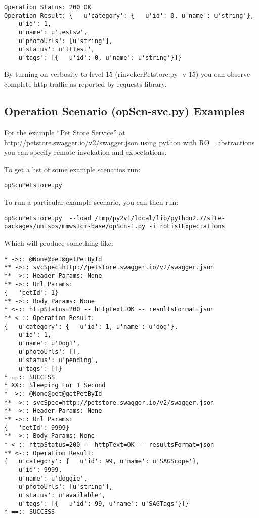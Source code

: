 \documentclass{article}
\begin{document}
\begin{verbatim}
Operation Status: 200 OK
Operation Result: {   u'category': {   u'id': 0, u'name': u'string'},
    u'id': 1,
    u'name': u'testsw',
    u'photoUrls': [u'string'],
    u'status': u'tttest',
    u'tags': [{   u'id': 0, u'name': u'string'}]}
\end{verbatim}

By turning on verbosity to level 15 (rinvokerPetstore.py -v 15) you can observe 
complete  http traffic as reported by requests library.

\subsection{Operation Scenario (opScn-svc.py) Examples}

For the example ``Pet Store Service'' at http://petstore.swagger.io/v2/swagger.json
using python with RO\_ abstractions you can specify remote invokation and expectations.

To get a list of some example scenatios run:

\begin{verbatim}
opScnPetstore.py
\end{verbatim}

To run a particular example scenario, you can then run:

\begin{verbatim}
opScnPetstore.py  --load /tmp/py2v1/local/lib/python2.7/site-packages/unisos/mmwsIcm-base/opScn-1.py -i roListExpectations
\end{verbatim}

Which will produce something like:

\begin{verbatim}
* ->:: @None@pet@getPetById
** ->:: svcSpec=http://petstore.swagger.io/v2/swagger.json
** ->:: Header Params: None
** ->:: Url Params: 
{   'petId': 1}
** ->:: Body Params: None
* <-:: httpStatus=200 -- httpText=OK -- resultsFormat=json
** <-:: Operation Result: 
{   u'category': {   u'id': 1, u'name': u'dog'},
    u'id': 1,
    u'name': u'Dog1',
    u'photoUrls': [],
    u'status': u'pending',
    u'tags': []}
* ==:: SUCCESS
* XX:: Sleeping For 1 Second
* ->:: @None@pet@getPetById
** ->:: svcSpec=http://petstore.swagger.io/v2/swagger.json
** ->:: Header Params: None
** ->:: Url Params: 
{   'petId': 9999}
** ->:: Body Params: None
* <-:: httpStatus=200 -- httpText=OK -- resultsFormat=json
** <-:: Operation Result: 
{   u'category': {   u'id': 99, u'name': u'SAGScope'},
    u'id': 9999,
    u'name': u'doggie',
    u'photoUrls': [u'string'],
    u'status': u'available',
    u'tags': [{   u'id': 99, u'name': u'SAGTags'}]}
* ==:: SUCCESS

\end{verbatim}
\end{document}
